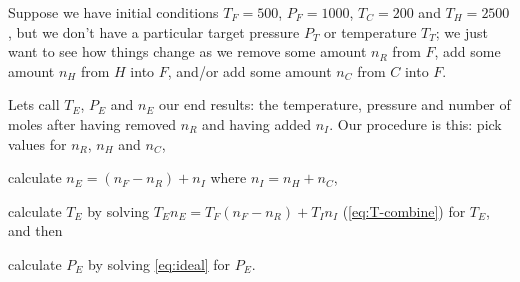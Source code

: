 \documentclass{article}
\begin{document}
\begin{example*}
    Suppose we have initial conditions $T_F=500$, $P_F=1000$, $T_C=200$ and $T_H=2500$,
    but we don't have a particular target pressure $P_T$ or temperature $T_T$;
    we just want to see how things change as we remove some amount $n_R$ from $F$,
    add some amount $n_H$ from $H$ into $F$,
    and/or add some amount $n_C$ from $C$ into $F$.

    Lets call $T_E$, $P_E$ and $n_E$ our end results: the temperature, pressure and number
    of moles after having removed $n_R$ and having added $n_I$.
    Our procedure is this: pick values for $n_R$, $n_H$ and $n_C$,
    \begin{enumerate*}[label=(\alph*)]
        \item calculate $n_E=(n_F-n_R)+n_I$ where $n_I=n_H+n_C$,
        \item calculate $T_E$ by solving $T_E n_E=T_F(n_F-n_R)+T_I n_I$
            (\cref{eq:T-combine}) for $T_E$, and then
        \item calculate $P_E$ by solving \cref{eq:ideal} for $P_E$.
    \end{enumerate*}


\end{example*}
\end{document}
